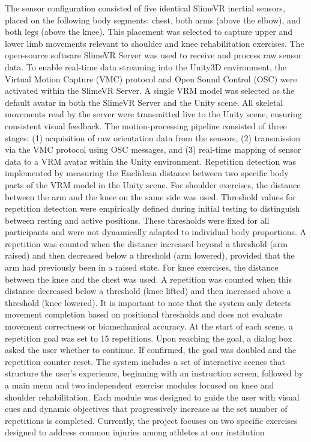 \documentclass[a4paper,twoside]{article}
\begin{document}
The sensor configuration consisted of five identical SlimeVR inertial sensors, placed on the following body segments: chest, both arms (above the elbow), and both legs (above the knee). This placement was selected to capture upper and lower limb movements relevant to shoulder and knee rehabilitation exercises. The open-source software SlimeVR Server was used to receive and process raw sensor data. To enable real-time data streaming into the Unity3D environment, the Virtual Motion Capture (VMC) protocol and Open Sound Control (OSC) were activated within the SlimeVR Server. A single VRM model was selected as the default avatar in both the SlimeVR Server and the Unity scene. All skeletal movements read by the server were transmitted live to the Unity scene, ensuring consistent visual feedback.  
The motion-processing pipeline consisted of three stages: (1) acquisition of raw orientation data from the sensors, (2) transmission via the VMC protocol using OSC messages, and (3) real-time mapping of sensor data to a VRM avatar within the Unity environment. 
Repetition detection was implemented by measuring the Euclidean distance between two specific body parts of the VRM model in the Unity scene. For shoulder exercises, the distance between the arm and the knee on the same side was used. Threshold values for repetition detection were empirically defined during initial testing to distinguish between resting and active positions. These thresholds were fixed for all participants and were not dynamically adapted to individual body proportions. A repetition was counted when the distance increased beyond a threshold (arm raised) and then decreased below a threshold (arm lowered), provided that the arm had previously been in a raised state. For knee exercises, the distance between the knee and the chest was used. A repetition was counted when this distance decreased below a threshold (knee lifted) and then increased above a threshold (knee lowered).  It is important to note that the system only detects movement completion based on positional thresholds and does not evaluate movement correctness or biomechanical accuracy. 
At the start of each scene, a repetition goal was set to 15 repetitions. Upon reaching the goal, a dialog box asked the user whether to continue. If confirmed, the goal was doubled and the repetition counter reset. 
The system includes a set of interactive scenes that structure the user’s experience, beginning with an instruction screen, followed by a main menu and two independent exercise modules focused on knee and shoulder rehabilitation. Each module was designed to guide the user with visual cues and dynamic objectives that progressively increase as the set number of repetitions is completed. Currently, the project focuses on two specific exercises designed to address common injuries among athletes at our institution 
\end{document}
